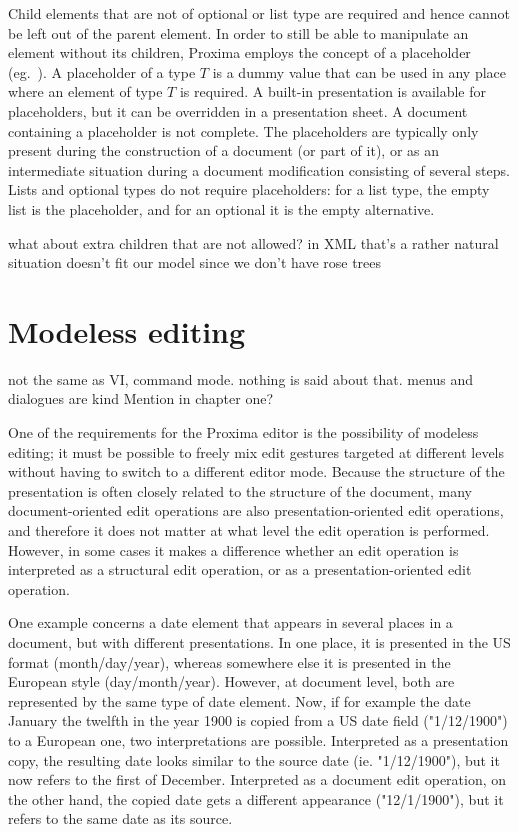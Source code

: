 Child elements that are not of optional or list type are required and hence cannot be left out of the parent element. In order to still be able to manipulate an element without its children, Proxima employs the concept of a placeholder (eg.~\cite{syngen}). A placeholder of a type $T$ is a dummy value that can be used in any place where an element of type $T$ is required. A built-in presentation is available for placeholders, but it can be overridden in a presentation sheet. A document containing a placeholder is not complete. The placeholders are typically only present during the construction of a document (or part of it), or as an intermediate situation during a document modification consisting of several steps. Lists and optional types do not require placeholders: for a list type, the empty list is the placeholder, and for an optional it is the empty alternative.

\bc
what about extra children that are not allowed? in XML that's a rather natural situation doesn't fit our model since we don't have rose trees
\ec

%																
%																
%																
\section{Modeless editing}

\bc
not the same as VI, command mode. nothing is said about that. menus and dialogues are kind %
Mention in chapter one?
\ec

One of the requirements for the Proxima editor is the possibility of modeless editing; it must be possible to freely mix edit gestures targeted at different levels without having to switch to a different editor mode. Because the structure of the presentation is often closely related to the structure of the document, many document-oriented edit operations are also presentation-oriented edit operations, and therefore it does not matter at what level the edit operation is performed. However, in some cases it makes a difference whether an edit operation is interpreted as a structural edit operation, or as a presentation-oriented edit operation.


One example concerns a date element that appears in several places in a document, but with different presentations. In one place, it is presented in the US format (month/day/year), whereas somewhere else it is presented in the European style (day/month/year). However, at document level, both are represented by the same type of date element. Now, if for example the date January the twelfth in the year 1900 is copied from a US date field ("1/12/1900") to a European one, two interpretations are possible. Interpreted as a presentation copy, the resulting date looks similar to the source date (ie. "1/12/1900"), but it now refers to the first of December. Interpreted as a document edit operation, on the other hand, the copied date gets a different appearance ("12/1/1900"), but it refers to the same date as its source.

